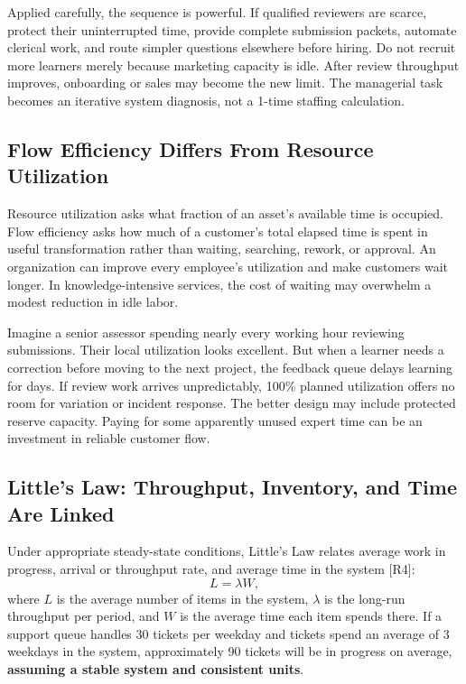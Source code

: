Applied carefully, the sequence is powerful. If qualified reviewers are scarce, protect their uninterrupted time, provide complete submission packets, automate clerical work, and route simpler questions elsewhere before hiring. Do not recruit more learners merely because marketing capacity is idle. After review throughput improves, onboarding or sales may become the new limit. The managerial task becomes an iterative system diagnosis, not a 1-time staffing calculation.

\subsection{Flow Efficiency Differs From Resource Utilization}
\label{sec:flow_efficiency_vs_utilization}

Resource utilization asks what fraction of an asset's available time is occupied. Flow efficiency asks how much of a customer's total elapsed time is spent in useful transformation rather than waiting, searching, rework, or approval. An organization can improve every employee's utilization and make customers wait longer. In knowledge-intensive services, the cost of waiting may overwhelm a modest reduction in idle labor.

Imagine a senior assessor spending nearly every working hour reviewing submissions. Their local utilization looks excellent. But when a learner needs a correction before moving to the next project, the feedback queue delays learning for days. If review work arrives unpredictably, 100\% planned utilization offers no room for variation or incident response. The better design may include protected reserve capacity. Paying for some apparently unused expert time can be an investment in reliable customer flow.

\subsection{Little's Law: Throughput, Inventory, and Time Are Linked}
\label{sec:littles_law}

Under appropriate steady-state conditions, Little's Law relates average work in progress, arrival or throughput rate, and average time in the system [R4]:
\begin{equation}
\label{eq:littles_law}
L = \lambda W,
\end{equation}
where $L$ is the average number of items in the system, $\lambda$ is the long-run throughput per period, and $W$ is the average time each item spends there. If a support queue handles 30 tickets per weekday and tickets spend an average of 3 weekdays in the system, approximately 90 tickets will be in progress on average, \textbf{assuming a stable system and consistent units}.

